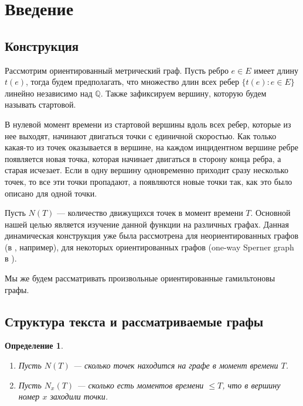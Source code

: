 \documentclass{article}
\newtheorem{definition}{Определение}
\begin{document}
\tableofcontents

\pagebreak

\section{Введение}

\subsection{Конструкция}

Рассмотрим ориентированный метрический граф. Пусть ребро $e \in E$ имеет длину $t(e)$, тогда будем предполагать, что множество длин всех ребер $\{t(e): e \in E\}$ линейно независимо над $\mathbb{Q}$. Также зафиксируем вершину, которую будем называть стартовой.

В нулевой момент времени из стартовой вершины вдоль всех ребер, которые из нее выходят, начинают двигаться точки с единичной скоростью. Как только какая-то из точек оказывается в вершине, на каждом инцидентном вершине ребре появляется новая точка, которая начинает двигаться в сторону конца ребра, а старая исчезает. Если в одну вершину одновременно приходит сразу несколько точек, то все эти точки пропадают, а появляются новые точки так, как это было описано для одной точки.


Пусть $N(T)$ --- количество движущихся точек в момент времени $T$. Основной нашей целью является изучение данной функции на различных графах.
Данная динамическая конструкция уже была рассмотрена для неориентированных графов (в \cite{poly}, например), для некоторых ориентированных графов (one-way Sperner graph в \cite{2021}).

Мы же будем рассматривать произвольные ориентированные гамильтоновы графы.



\subsection{Структура текста и рассматриваемые графы}


\begin{definition} $ $
    \begin{enumerate}
        \item Пусть $N(T)$ --- сколько точек находится на графе в момент времени $T$.
        \item Пусть $N_{x}(T)$ --- сколько есть моментов времени $\leq T$, что в вершину номер $x$ заходили точки.
    \end{enumerate}
\end{definition}
\end{document}
